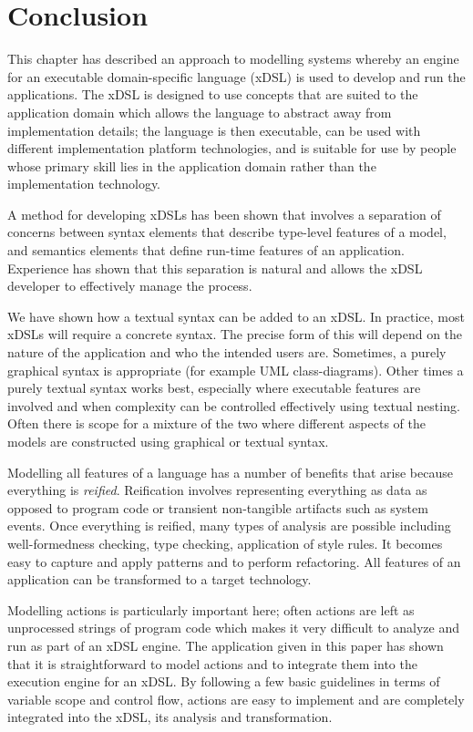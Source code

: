 \section{Conclusion\label{sec:Conclusion}}

This chapter has described an approach to modelling systems whereby
an engine for an executable domain-specific language (xDSL) is used
to develop and run the applications. The xDSL is designed to use concepts
that are suited to the application domain which allows the language
to abstract away from implementation details; the language is then
executable, can be used with different implementation platform technologies,
and is suitable for use by people whose primary skill lies in the
application domain rather than the implementation technology.

A method for developing xDSLs has been shown that involves a separation
of concerns between syntax elements that describe type-level features
of a model, and semantics elements that define run-time features of
an application. Experience has shown that this separation is natural
and allows the xDSL developer to effectively manage the process.

We have shown how a textual syntax can be added to an xDSL. In practice,
most xDSLs will require a concrete syntax. The precise form of this
will depend on the nature of the application and who the intended
users are. Sometimes, a purely graphical syntax is appropriate (for
example UML class-diagrams). Other times a purely textual syntax works
best, especially where executable features are involved and when complexity
can be controlled effectively using textual nesting. Often there is
scope for a mixture of the two where different aspects of the models
are constructed using graphical or textual syntax.

Modelling all features of a language has a number of benefits that
arise because everything is \emph{reified}. Reification involves representing
everything as data as opposed to program code or transient non-tangible
artifacts such as system events. Once everything is reified, many
types of analysis are possible including well-formedness checking,
type checking, application of style rules. It becomes easy to capture
and apply patterns and to perform refactoring. All features of an
application can be transformed to a target technology. 

Modelling actions is particularly important here; often actions are
left as unprocessed strings of program code which makes it very difficult
to analyze and run as part of an xDSL engine. The application given
in this paper has shown that it is straightforward to model actions
and to integrate them into the execution engine for an xDSL. By following
a few basic guidelines in terms of variable scope and control flow,
actions are easy to implement and are completely integrated into the
xDSL, its analysis and transformation.

